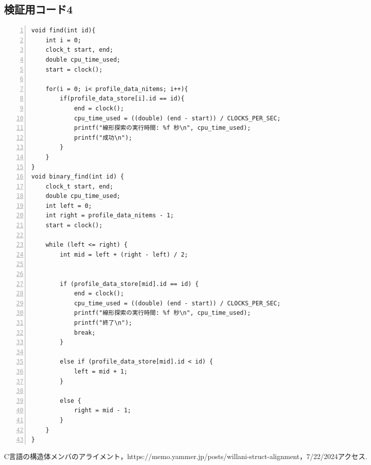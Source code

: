 \subsection{検証用コード4}\label{code4}
\begin{Verbatim}[numbers=left, xleftmargin=10mm, numbersep=6pt,
  fontsize=\small, baselinestretch=0.8]
  void find(int id){
    int i = 0;
    clock_t start, end;
    double cpu_time_used;
    start = clock();

    for(i = 0; i< profile_data_nitems; i++){
        if(profile_data_store[i].id == id){
            end = clock();
            cpu_time_used = ((double) (end - start)) / CLOCKS_PER_SEC;
            printf("線形探索の実行時間: %f 秒\n", cpu_time_used);
            printf("成功\n");
        }
    }
}
void binary_find(int id) {
    clock_t start, end;
    double cpu_time_used;
    int left = 0;
    int right = profile_data_nitems - 1;
    start = clock();

    while (left <= right) {
        int mid = left + (right - left) / 2;

     
        if (profile_data_store[mid].id == id) {
            end = clock();
            cpu_time_used = ((double) (end - start)) / CLOCKS_PER_SEC;
            printf("線形探索の実行時間: %f 秒\n", cpu_time_used);
            printf("終了\n");
            break;
        }
     
        else if (profile_data_store[mid].id < id) {
            left = mid + 1;
        }
 
        else {
            right = mid - 1;
        }
    }
}
\end{Verbatim}

\begin{thebibliography}{99}
   C言語の構造体メンバのアライメント，https://memo.yammer.jp/posts/willani-struct-alignment，7/22/2024アクセス.
\end{thebibliography}



